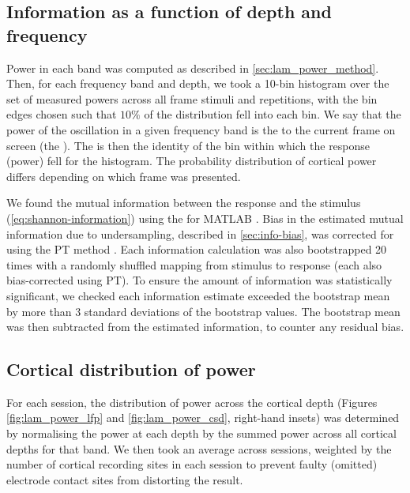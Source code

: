 \subsection{Information as a function of depth and frequency}
\label{sec:lam_info_method}

Power in each band was computed as described in \autoref{sec:lam_power_method}.
Then, for each frequency band and depth, we took a \num{10}-bin histogram over the set of measured powers across all frame stimuli and repetitions, with the bin edges chosen such that $10\%$ of the distribution fell into each bin.
We say that the power of the oscillation in a given frequency band is the  to the current frame on screen (the ).
The  is then the identity of the bin within which the response (power) fell for the histogram.
The probability distribution of cortical power differs depending on which frame was presented.

We found the mutual information between the response and the stimulus (\autoref{eq:shannon-information}) using the  for MATLAB \citep{Magri2009}.
Bias in the estimated mutual information due to undersampling, described in \autoref{sec:info-bias}, was corrected for using the \ac{PT} method \citep{Treves1995}.
Each information calculation was also bootstrapped \num{20} times with a randomly shuffled mapping from stimulus to response (each also bias-corrected using \ac{PT}).
To ensure the amount of information was statistically significant, we checked each information estimate exceeded the bootstrap mean by more than \num{3} standard deviations of the bootstrap values.
The bootstrap mean was then subtracted from the estimated information, to counter any residual bias.


\subsection{Cortical distribution of power}

For each session, the distribution of power across the cortical depth (Figures \ref{fig:lam_power_lfp} and \ref{fig:lam_power_csd}, right-hand insets) was determined by normalising the power at each depth by the summed power across all cortical depths for that band.
We then took an average across sessions, weighted by the number of cortical recording sites in each session to prevent faulty (omitted) electrode contact sites from distorting the result.


